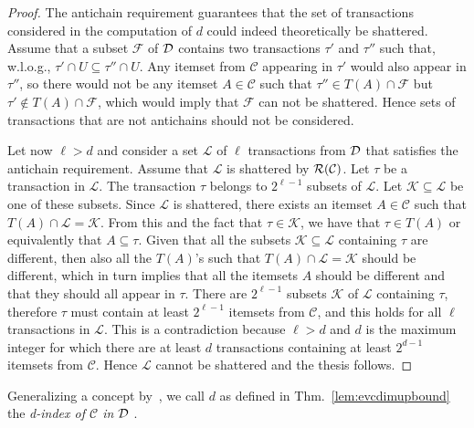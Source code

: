 \begin{proof}
  The antichain requirement guarantees that the set of transactions considered in
  the computation of $d$ could indeed theoretically be shattered. Assume that a
  subset $\mathcal{F}$ of ${\cal D}$ contains two transactions $\tau'$ and $\tau''$
  such that, w.l.o.g., $\tau' \cap U\subseteq\tau''\cap U$. Any itemset from
  $\mathcal{C}$ appearing in $\tau'$ would also appear in $\tau''$, so there
  would not be any itemset $A\in\mathcal{C}$ such that $\tau''\in T(A)\cap
  \mathcal{F}$ but $\tau'\not\in T(A)\cap \mathcal{F}$, which would imply that
  $\mathcal{F}$ can not be shattered. Hence sets of transactions that are not
  antichains should not be considered.

  Let now $\ell>d$ and consider a set $\mathcal{L}$ of $\ell$ transactions from
  ${\cal D}$ that satisfies the antichain requirement. Assume that $\mathcal{L}$ is
  shattered by $\mathcal{R}(\mathcal{C})$. Let $\tau$ be a transaction in
  $\mathcal{L}$. The transaction $\tau$ belongs to $2^{\ell-1}$ subsets of $\mathcal{L}$.
  Let $\mathcal{K}\subseteq \mathcal{L}$ be one of these subsets. Since
  $\mathcal{L}$ is shattered, there exists an itemset $A\in\mathcal{C}$ such
  that $T(A)\cap \mathcal{L}=\mathcal{K}$. From this and the fact that $\tau\in
  \mathcal{K}$, we have that $\tau\in T(A)$ or equivalently that
  $A\subseteq\tau$. Given that all the subsets $\mathcal{K}\subseteq\mathcal{L}$
  containing $\tau$ are different, then also all the $T(A)$'s such that
  $T(A)\cap \mathcal{L}=\mathcal{K}$ should be different, which in turn implies
  that all the itemsets $A$ should be different and that they should all appear
  in $\tau$. There are $2^{\ell-1}$ subsets $\mathcal{K}$ of $\mathcal{L}$
  containing $\tau$, therefore $\tau$ must contain at least $2^{\ell-1}$
  itemsets from $\mathcal{C}$, and this holds for all $\ell$ transactions in
  $\mathcal{L}$. This is a contradiction because $\ell>d$ and $d$ is the maximum
  integer for which there are at least $d$ transactions containing at least
  $2^{d-1}$ itemsets from $\mathcal{C}$. Hence $\mathcal{L}$ cannot be shattered
  and the thesis follows.
\end{proof}

Generalizing a concept by~\citet{RiondatoU14}, we call $d$ as defined in
Thm.~\ref{lem:evcdimupbound} the \emph{d-index of $\mathcal{C}$ in ${\cal D}$} .

